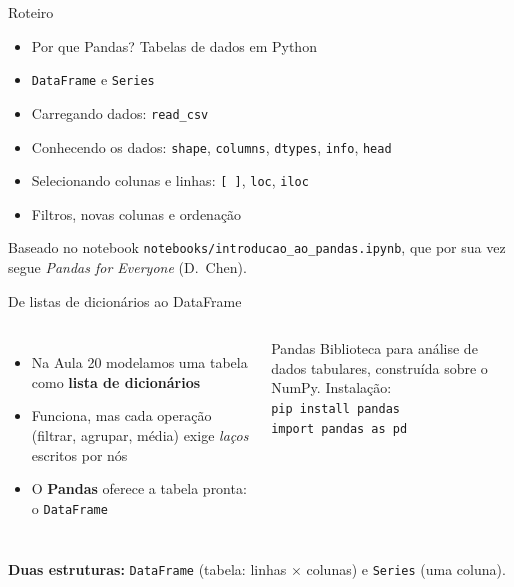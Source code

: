 \documentclass[aspectratio=169,10pt,t]{beamer}
\begin{document}
\capa

\begin{frame}{Roteiro}
  \begin{itemize}
    \item Por que Pandas? Tabelas de dados em Python
    \item \texttt{DataFrame} e \texttt{Series}
    \item Carregando dados: \texttt{read\_csv}
    \item Conhecendo os dados: \texttt{shape}, \texttt{columns}, \texttt{dtypes}, \texttt{info}, \texttt{head}
    \item Selecionando colunas e linhas: \texttt{[ ]}, \texttt{loc}, \texttt{iloc}
    \item Filtros, novas colunas e ordenação
  \end{itemize}
  \vspace{1ex}
  {\footnotesize Baseado no notebook \texttt{notebooks/introducao\_ao\_pandas.ipynb}, que por sua vez segue \emph{Pandas for Everyone} (D.~Chen).}
\end{frame}

\begin{frame}{De listas de dicionários ao DataFrame}
  \begin{columns}[T]
    \begin{itemize}
      \item Na Aula 20 modelamos uma tabela como \textbf{lista de dicionários}
      \item Funciona, mas cada operação (filtrar, agrupar, média) exige \emph{laços} escritos por nós
      \item O \textbf{Pandas} oferece a tabela pronta: o \texttt{DataFrame}
    \end{itemize}
    \begin{block}{Pandas}
      Biblioteca para análise de dados tabulares, construída sobre o NumPy. Instalação:\\
      \texttt{pip install pandas}\\[0.5ex]
      \texttt{import pandas as pd}
    \end{block}
  \end{columns}
  \vspace{1ex}
  \textbf{Duas estruturas:} \texttt{DataFrame} (tabela: linhas \(\times\) colunas) e \texttt{Series} (uma coluna).
\end{frame}
\end{document}
